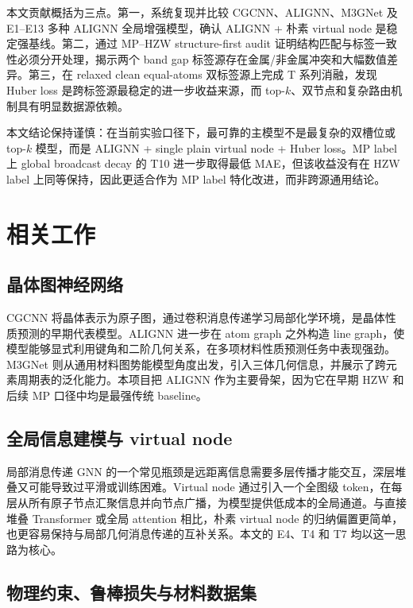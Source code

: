 \documentclass[UTF8,a4paper,11pt]{ctexart}
\begin{document}
本文贡献概括为三点。第一，系统复现并比较 CGCNN、ALIGNN、M3GNet 及 E1--E13 多种 ALIGNN 全局增强模型，确认 ALIGNN + 朴素 virtual node 是稳定强基线。第二，通过 MP--HZW structure-first audit 证明结构匹配与标签一致性必须分开处理，揭示两个 band gap 标签源存在金属/非金属冲突和大幅数值差异。第三，在 relaxed clean equal-atoms 双标签源上完成 T 系列消融，发现 Huber loss 是跨标签源最稳定的进一步收益来源，而 top-$k$、双节点和复杂路由机制具有明显数据源依赖。

本文结论保持谨慎：在当前实验口径下，最可靠的主模型不是最复杂的双槽位或 top-$k$ 模型，而是 ALIGNN + single plain virtual node + Huber loss。MP label 上 global broadcast decay 的 T10 进一步取得最低 MAE，但该收益没有在 HZW label 上同等保持，因此更适合作为 MP label 特化改进，而非跨源通用结论。

\section{相关工作}

\subsection{晶体图神经网络}

CGCNN 将晶体表示为原子图，通过卷积消息传递学习局部化学环境，是晶体性质预测的早期代表模型\cite{xie2018cgcnn}。ALIGNN 进一步在 atom graph 之外构造 line graph，使模型能够显式利用键角和二阶几何关系，在多项材料性质预测任务中表现强劲\cite{choudhary2021alignn}。M3GNet 则从通用材料图势能模型角度出发，引入三体几何信息，并展示了跨元素周期表的泛化能力\cite{chen2022m3gnet}。本项目把 ALIGNN 作为主要骨架，因为它在早期 HZW 和后续 MP 口径中均是最强传统 baseline。

\subsection{全局信息建模与 virtual node}

局部消息传递 GNN 的一个常见瓶颈是远距离信息需要多层传播才能交互，深层堆叠又可能导致过平滑或训练困难。Virtual node 通过引入一个全图级 token，在每层从所有原子节点汇聚信息并向节点广播，为模型提供低成本的全局通道。与直接堆叠 Transformer 或全局 attention 相比，朴素 virtual node 的归纳偏置更简单，也更容易保持与局部几何消息传递的互补关系。本文的 E4、T4 和 T7 均以这一思路为核心。

\subsection{物理约束、鲁棒损失与材料数据集}
\end{document}
